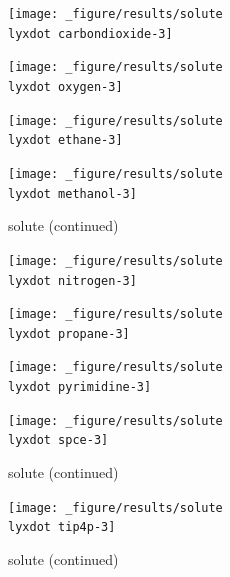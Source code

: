 \begin{figure}[!tbph]
\ContinuedFloat
\begin{centering}
\texttt{[image: \_figure/results/solute\\lyxdot carbondioxide-3]}
\par\end{centering}
\begin{centering}
\texttt{[image: \_figure/results/solute\\lyxdot oxygen-3]}
\par\end{centering}
\begin{centering}
\texttt{[image: \_figure/results/solute\\lyxdot ethane-3]}
\par\end{centering}
\begin{centering}
\texttt{[image: \_figure/results/solute\\lyxdot methanol-3]}
\par\end{centering}
\caption[]{solute (continued)}
\end{figure}

\begin{figure}[!tbph]
\ContinuedFloat
\begin{centering}
\texttt{[image: \_figure/results/solute\\lyxdot nitrogen-3]}
\par\end{centering}
\begin{centering}
\texttt{[image: \_figure/results/solute\\lyxdot propane-3]}
\par\end{centering}
\begin{centering}
\texttt{[image: \_figure/results/solute\\lyxdot pyrimidine-3]}
\par\end{centering}
\begin{centering}
\texttt{[image: \_figure/results/solute\\lyxdot spce-3]}
\par\end{centering}
\caption[]{solute (continued)}
\end{figure}

\begin{figure}[!tbph]
\ContinuedFloat
\begin{centering}
\texttt{[image: \_figure/results/solute\\lyxdot tip4p-3]}
\par\end{centering}
\caption[]{solute (continued)}
\end{figure}

